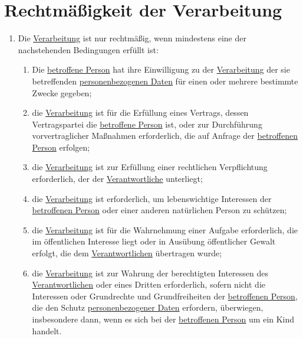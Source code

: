 \chapter{Rechtmäßigkeit der Verarbeitung}
\label{ch:6}


\begin{enumerate}

  \item Die \hyperref[itm:04-2]{Verarbeitung} ist nur rechtmäßig, wenn mindestens eine der nachstehenden Bedingungen erfüllt ist:
  \label{itm:06-1}

  \begin{enumerate}
  
    \item Die \hyperref[itm:04-1]{betroffene Person} hat ihre Einwilligung zu der \hyperref[itm:04-2]{Verarbeitung} der sie betreffenden \hyperref[itm:04-1]{personenbezogenen Daten}
     für einen oder mehrere bestimmte Zwecke gegeben;
    \label{itm:06-1a}

    \item die \hyperref[itm:04-2]{Verarbeitung} ist für die Erfüllung eines Vertrags, dessen Vertragspartei die \hyperref[itm:04-1]{betroffene Person} ist, oder
     zur Durchführung vorvertraglicher Maßnahmen erforderlich, die auf Anfrage der \hyperref[itm:04-1]{betroffenen Person} erfolgen;
    \label{itm:06-1b}

    \item die \hyperref[itm:04-2]{Verarbeitung} ist zur Erfüllung einer rechtlichen Verpflichtung erforderlich, der der \hyperref[itm:04-7]{Verantwortliche}
     unterliegt;
    \label{itm:06-1c}

    \item die \hyperref[itm:04-2]{Verarbeitung} ist erforderlich, um lebenswichtige Interessen der \hyperref[itm:04-1]{betroffenen Person} oder einer anderen
     natürlichen Person zu schützen;
    \label{itm:06-1d}

    \item die \hyperref[itm:04-2]{Verarbeitung} ist für die Wahrnehmung einer Aufgabe erforderlich, die im öffentlichen Interesse liegt oder
     in Ausübung öffentlicher Gewalt erfolgt, die dem \hyperref[itm:04-7]{Verantwortlichen} übertragen wurde;
    \label{itm:06-1e}

    \item die \hyperref[itm:04-2]{Verarbeitung} ist zur Wahrung der berechtigten Interessen des \hyperref[itm:04-7]{Verantwortlichen} oder eines Dritten
     erforderlich, sofern nicht die Interessen oder Grundrechte und Grundfreiheiten der \hyperref[itm:04-1]{betroffenen Person}, die den
     Schutz \hyperref[itm:04-1]{personenbezogener Daten} erfordern, überwiegen, insbesondere dann, wenn es sich bei der \hyperref[itm:04-1]{betroffenen Person}
     um ein Kind handelt.
    \label{itm:06-1f}


\end{enumerate}
\end{enumerate}
